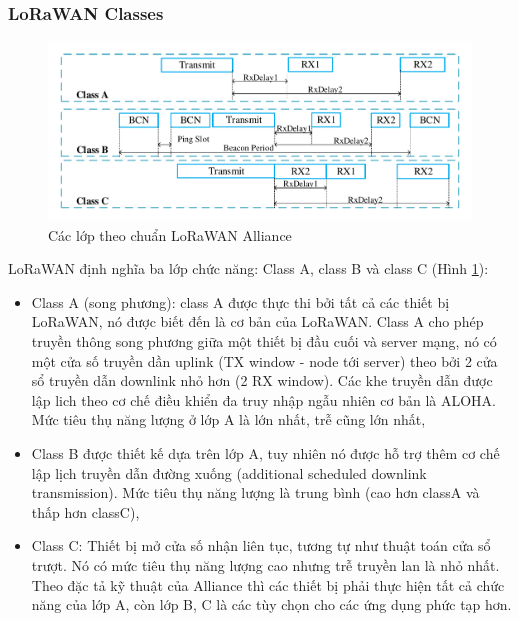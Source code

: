 \subsubsection{LoRaWAN Classes}
	\begin{figure}[h!] %
			\centering
			\includegraphics[width=\linewidth]{./img/29.pdf}
			\caption{Các lớp theo chuẩn LoRaWAN Alliance}
			\label{fig:fig29}
	\end{figure}
LoRaWAN định nghĩa ba lớp chức năng: Class A, class B và class C (Hình \ref{fig:fig29}):
\begin{itemize}
\item	Class A (song phương): class A được thực thi bởi tất cả các thiết bị LoRaWAN, nó được biết đến là cơ bản của LoRaWAN. Class A cho phép truyền thông song phương giữa một thiết bị đầu cuối và server mạng, nó có một cửa số truyền dần uplink (TX window - node tới server) theo bởi 2 cửa sổ truyền dẫn downlink nhỏ hơn (2 RX window). Các khe truyền dẫn được lập lich theo cơ chế điều khiển đa truy nhập ngẫu nhiên cơ bản là ALOHA. Mức tiêu thụ năng lượng ở lớp A là lớn nhất, trễ cũng lớn nhất,
\item	Class B được thiết kế dựa trên lớp A, tuy nhiên nó được hỗ trợ thêm cơ chế lập lịch truyền dẫn đường xuống (additional scheduled downlink transmission). Mức tiêu thụ năng lượng là trung bình (cao hơn classA và thấp hơn classC),
\item	Class C: Thiết bị mở cửa số nhận liên tục, tương tự như thuật toán cửa sổ trượt. Nó có mức tiêu thụ năng lượng cao nhưng trễ truyền lan là nhỏ nhất. Theo đặc tả kỹ thuật của Alliance thì các thiết bị phải thực hiện tất cả chức năng của lớp A, còn lớp B, C là các tùy chọn cho các ứng dụng phức tạp hơn.

\end{itemize}

